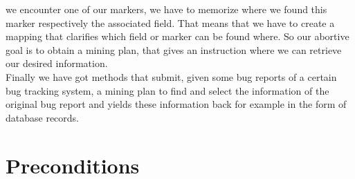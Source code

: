 we encounter one of our markers, we have to memorize where we found this marker respectively the associated field. That means that we have to create a mapping that clarifies which field or marker can be found where. So our abortive goal is to obtain a mining plan, that gives an instruction where we can retrieve our desired information. \\  Finally we have got methods that submit, given some bug reports of a certain bug tracking system, a mining plan to find and select the information of the original bug report and yields these information back for example in the form of database records. 

\section{Preconditions}
\label{Preconditions}

